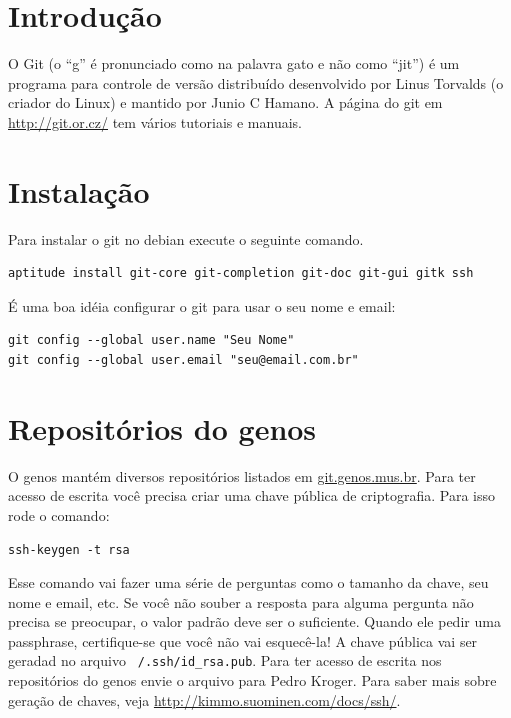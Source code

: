 \documentclass[12pt,brazil]{book}
\begin{document}
\section{Introdução}
\label{sec:introducao}

O Git (o ``g'' é pronunciado como na palavra gato e não como ``jit'')
é um programa para controle de versão distribuído desenvolvido por
Linus Torvalds (o criador do Linux) e mantido por Junio C Hamano. A
página do git em \url{http://git.or.cz/} tem vários tutoriais e
manuais.

\section{Instalação}
\label{sec:instalacao-3}

Para instalar o git no debian execute o seguinte comando.

\begin{verbatim}
aptitude install git-core git-completion git-doc git-gui gitk ssh
\end{verbatim}

É uma boa idéia configurar o git para usar o seu nome e email:

\begin{verbatim}
git config --global user.name "Seu Nome"
git config --global user.email "seu@email.com.br"
\end{verbatim}

\section{Repositórios do genos}
\label{sec:acesso-de-escrita}

O genos mantém diversos repositórios listados em
\url{git.genos.mus.br}. Para ter acesso de escrita você precisa criar
uma chave pública de criptografia. Para isso rode o comando:

\begin{verbatim}
ssh-keygen -t rsa
\end{verbatim}

Esse comando vai fazer uma série de perguntas como o tamanho da chave,
seu nome e email, etc. Se você não souber a resposta para alguma
pergunta não precisa se preocupar, o valor padrão deve ser o
suficiente. Quando ele pedir uma passphrase, certifique-se que você
não vai esquecê-la! A chave pública vai ser geradad no arquivo
\texttt{~/.ssh/id\_rsa.pub}. Para ter acesso de escrita nos
repositórios do genos envie o arquivo para Pedro Kroger. Para saber
mais sobre geração de chaves, veja
\url{http://kimmo.suominen.com/docs/ssh/}.
\end{document}
